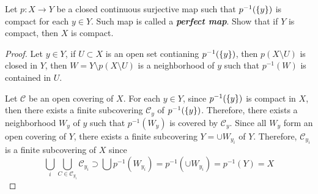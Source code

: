 \documentclass[12pt,a4paper]{article}
\begin{document}
    \begin{ex}\label{3.4.20}
        Let $p:X\to Y$ be a closed continuous surjective map such that $p^{-1}(\left\{y\right\})$ is compact for each $y\in Y$. Such map is called a \textbf{\textit{perfect map}}. Show that if $Y$ is compact, then $X$ is compact.
    \end{ex}
    \begin{proof}
        Let $y\in Y$, if $U\subset X$ is an open set contianing $p^{-1}(\left\{y\right\})$, then $p(X\setminus U)$ is closed in $Y$, then $W=Y\setminus p(X\setminus U)$ is a neighborhood of $y$ such that $p^{-1}(W)$ is contained in $U$.

        Let $\mathcal{C}$ be an open covering of $X$. For each $y\in Y$, since $p^{-1}(\left\{y\right\})$ is compact in $X$, then there exists a finite subcovering $\mathcal{C}_y$ of $p^{-1}(\left\{y\right\})$. Therefore, there exists a neighborhood $W_y$ of $y$ such that $p^{-1}(W_y)$ is covered by $\mathcal{C}_y$. Since all $W_y$ form an open covering of $Y$, there exists a finite subcovering $Y=\cup W_{y_i}$ of $Y$. Therefore, $\mathcal{C}_{y_i}$ is a finite subcovering of $X$ since
        $$
        \bigcup_i\bigcup_{C\in \mathcal{C}_{y_i}} \mathcal{C}_{y_i}\supset\bigcup p^{-1}(W_{y_i})=p^{-1}(\cup W_{y_i})=p^{-1}(Y)=X
        $$
    \end{proof}
    \hfill
\end{document}

